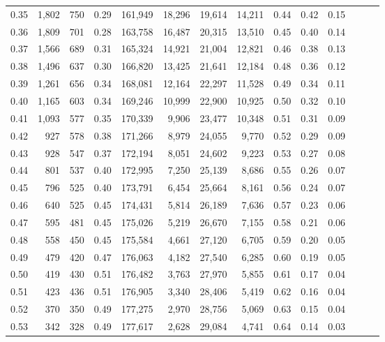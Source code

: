\begin{tabular}{rrrrrrrrrrrrrr}
0.35 &  1,802 &  750 &  0.29 &  161,949 &   18,296 &  19,614 &  14,211 &  0.44 &  0.42 &      0.15 \\
0.36 &  1,809 &  701 &  0.28 &  163,758 &   16,487 &  20,315 &  13,510 &  0.45 &  0.40 &      0.14 \\
0.37 &  1,566 &  689 &  0.31 &  165,324 &   14,921 &  21,004 &  12,821 &  0.46 &  0.38 &      0.13 \\
0.38 &  1,496 &  637 &  0.30 &  166,820 &   13,425 &  21,641 &  12,184 &  0.48 &  0.36 &      0.12 \\
0.39 &  1,261 &  656 &  0.34 &  168,081 &   12,164 &  22,297 &  11,528 &  0.49 &  0.34 &      0.11 \\
0.40 &  1,165 &  603 &  0.34 &  169,246 &   10,999 &  22,900 &  10,925 &  0.50 &  0.32 &      0.10 \\
0.41 &  1,093 &  577 &  0.35 &  170,339 &    9,906 &  23,477 &  10,348 &  0.51 &  0.31 &      0.09 \\
0.42 &    927 &  578 &  0.38 &  171,266 &    8,979 &  24,055 &   9,770 &  0.52 &  0.29 &      0.09 \\
0.43 &    928 &  547 &  0.37 &  172,194 &    8,051 &  24,602 &   9,223 &  0.53 &  0.27 &      0.08 \\
0.44 &    801 &  537 &  0.40 &  172,995 &    7,250 &  25,139 &   8,686 &  0.55 &  0.26 &      0.07 \\
0.45 &    796 &  525 &  0.40 &  173,791 &    6,454 &  25,664 &   8,161 &  0.56 &  0.24 &      0.07 \\
0.46 &    640 &  525 &  0.45 &  174,431 &    5,814 &  26,189 &   7,636 &  0.57 &  0.23 &      0.06 \\
0.47 &    595 &  481 &  0.45 &  175,026 &    5,219 &  26,670 &   7,155 &  0.58 &  0.21 &      0.06 \\
0.48 &    558 &  450 &  0.45 &  175,584 &    4,661 &  27,120 &   6,705 &  0.59 &  0.20 &      0.05 \\
0.49 &    479 &  420 &  0.47 &  176,063 &    4,182 &  27,540 &   6,285 &  0.60 &  0.19 &      0.05 \\
0.50 &    419 &  430 &  0.51 &  176,482 &    3,763 &  27,970 &   5,855 &  0.61 &  0.17 &      0.04 \\
0.51 &    423 &  436 &  0.51 &  176,905 &    3,340 &  28,406 &   5,419 &  0.62 &  0.16 &      0.04 \\
0.52 &    370 &  350 &  0.49 &  177,275 &    2,970 &  28,756 &   5,069 &  0.63 &  0.15 &      0.04 \\
0.53 &    342 &  328 &  0.49 &  177,617 &    2,628 &  29,084 &   4,741 &  0.64 &  0.14 &      0.03 \\

\end{tabular}
